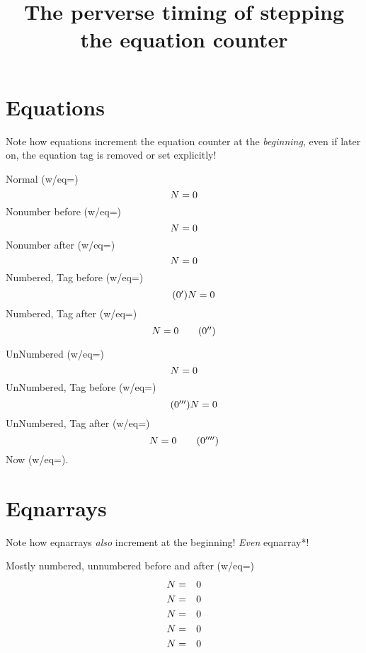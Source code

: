\documentclass{article}
\title{The perverse timing of stepping the equation counter}
\begin{document}
\maketitle
\section{Equations}
Note how equations increment the equation counter at the \emph{beginning},
even if later on, the equation tag is removed or set explicitly!

Normal (w/eq=\theequation)
\begin{equation}
N=\mbox{\theequation}
\end{equation}
Nonumber before (w/eq=\theequation)
\begin{equation}
\nonumber
N=\mbox{\theequation}
\end{equation}
Nonumber after (w/eq=\theequation)
\begin{equation}
N=\mbox{\theequation}
\nonumber
\end{equation}
Numbered, Tag before (w/eq=\theequation)
\begin{equation}
\tag{\theequation$'$}
N=\mbox{\theequation}
\end{equation}
Numbered, Tag after (w/eq=\theequation)
\begin{equation}
N=\mbox{\theequation}
\tag{\theequation$''$}
\end{equation}

UnNumbered (w/eq=\theequation)
\begin{equation*}
N=\mbox{\theequation}
\end{equation*}
UnNumbered, Tag before (w/eq=\theequation)
\begin{equation*}
\tag{\theequation$'''$}
N=\mbox{\theequation}
\end{equation*}
UnNumbered, Tag after (w/eq=\theequation)
\begin{equation*}
N=\mbox{\theequation}
\tag{\theequation$''''$}
\end{equation*}
Now (w/eq=\theequation).

\section{Eqnarrays}
Note how eqnarrays \emph{also} increment at the beginning!
\emph{Even} eqnarray*!

Mostly numbered, unnumbered before and after (w/eq=\theequation)
\begin{eqnarray}
N&=&\mbox{\theequation} \\
N&=&\mbox{\theequation} \\
\nonumber N&=&\mbox{\theequation} \\
N&=&\mbox{\theequation} \nonumber\\
N&=&\mbox{\theequation}
\end{eqnarray}
\end{document}
